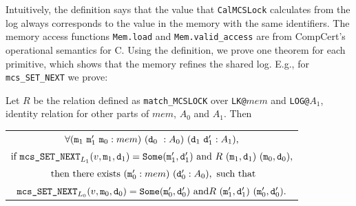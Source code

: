Intuitively, the definition says that the value that
\lstinline$CalMCSLock$ calculates from the log always corresponds to the value 
in the memory with the same identifiers. The memory access functions \lstinline$Mem.load$ and \lstinline$Mem.valid_access$ are
from CompCert's operational semantics for C.
Using the definition, we prove one theorem for each primitive, which
shows that the memory refines the shared log. E.g., for \lstinline$mcs_SET_NEXT$ we prove:

\begin{theorem}
  \label{thm:machine-state-refinement} Let $R$ be the relation defined as \lstinline$match_MCSLOCK$ 
over \lstinline$LK@$$mem$ and \lstinline$LOG@$$A_1$, 
identity relation for other parts of $mem$, $A_0$ and $A_1$. Then
 \begin{center}
 \begin{tabular}{c}
$ \forall (\codeinmath{{m}}_{1} \ \codeinmath{{m}}_{1}'\ \codeinmath{{m}}_{0} : mem)\  (\codeinmath{{d}}_{0} \ : A_0)\ (\codeinmath{{d}}_{1} \ \codeinmath{{d}}_{1}' : A_1),$ \\
$ \mbox{if } {\mathrm{\texttt{{mcs\_SET\_NEXT}}}}_{L_1}(v, {\mathrm{\texttt{{m}}}}_1, {\mathrm{\texttt{{d}}}}_1) = {\mathrm{\texttt{{Some}}}}({\mathrm{\texttt{{m}}}}'_1, {\mathrm{\texttt{{d}}}}'_1) \mbox{ and }
  R\ ({\mathrm{\texttt{{m}}}}_1, {\mathrm{\texttt{{d}}}}_1)\ ({\mathrm{\texttt{{m}}}}_0, {\mathrm{\texttt{{d}}}}_0),$\\
  $ \mbox{ then there exists } ({\mathrm{\texttt{{m}}}}_{0}' : mem)\ ({\mathrm{\texttt{{d}}}}_{0}' : A_0), \mbox{ such that}$\\
$  {\mathrm{\texttt{{mcs\_SET\_NEXT}}}}_{L_0}(v, {\mathrm{\texttt{{m}}}}_0, {\mathrm{\texttt{{d}}}}_0) = {\mathrm{\texttt{{Some}}}}({\mathrm{\texttt{{m}}}}'_0, {\mathrm{\texttt{{d}}}}'_0) \mbox{ and}
  R\ ({\mathrm{\texttt{{m}}}}'_1, {\mathrm{\texttt{{d}}}}'_1)\ ({\mathrm{\texttt{{m}}}}'_0, {\mathrm{\texttt{{d}}}}'_0).$ 
   \end{tabular}
 \end{center}
\end{theorem}


